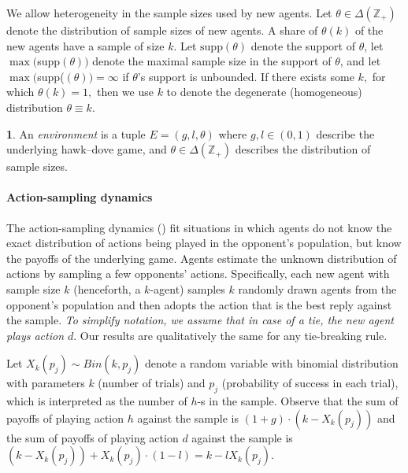\documentclass[12pt]{article}
\numberwithin{equation}{section}
\numberwithin{figure}{section}
\theoremstyle{definition}
\newtheorem{defn}{\protect\definitionname}
\theoremstyle{plain}
\theoremstyle{plain}
\theoremstyle{plain}
\theoremstyle{remark}
\theoremstyle{plain}
\theoremstyle{plain}
\providecommand{\definitionname}{Definition}
\def\t{\theta}
\def\D{\Delta}
\begin{document}
We allow heterogeneity in the sample sizes used by new agents. Let
$\theta\in\Delta\left(\mathbb{Z}_{+}\right)$ denote the distribution
of sample sizes of new agents. A share of $\theta\left(k\right)$
of the new agents have a sample of size $k$. Let
$\text{supp}\left(\theta\right)$ denote the support of $\theta$,  let 
$\max($supp$(\theta))$ 
denote the maximal 
sample size in the support of
$\theta$, and let $\max($supp($(\theta))=\infty$ if $\theta$'s
support is unbounded.
If there exists some $k,$ for which $\theta(k)=1,$ then we use
$k$ to denote the degenerate (homogeneous) distribution $\theta\equiv k$.

\begin{defn}
An \emph{environment} is a tuple $E=(g,l,\theta)$ where $g,l\in (0,1)$ describe the underlying hawk--dove game, and $\t\in\D\left(\mathbb{Z}_{+}\right)$ describes the distribution of sample sizes. 
\end{defn}


\paragraph{Action-sampling dynamics}
The action-sampling dynamics (\citealp{sandholm2001almost}) fit situations in which agents do not know the exact distribution of actions being played in the opponent's population, but know the payoffs of the underlying game. Agents estimate the unknown distribution of actions by sampling a few opponents' actions. Specifically, each new agent with sample size $k$ (henceforth, a $k$-agent) samples
$k$ randomly drawn agents from the opponent's population and then adopts the action that is the best reply  against the sample. 
\emph{To simplify notation, we assume that in case of a tie, the new agent plays action $d$}. Our results are
qualitatively the same for any tie-breaking rule.

Let ${X}_{k}\left(p_{j}\right)\sim Bin\left(k,p_{j}\right)$
denote a random variable with binomial distribution with parameters
$k$ (number of trials) and $p_{j}$ (probability of success in each
trial), which is interpreted as the number of $h$-s in the sample. 
Observe that the sum of payoffs of playing action $h$ against the sample is $(1+g)\cdot(k-X_k(p_j))$ and the sum of payoffs of playing action $d$ against the sample is
$(k-X_k(p_j))+X_k(p_j)\cdot(1-l)=k-lX_k(p_j)$. 
\end{document}
